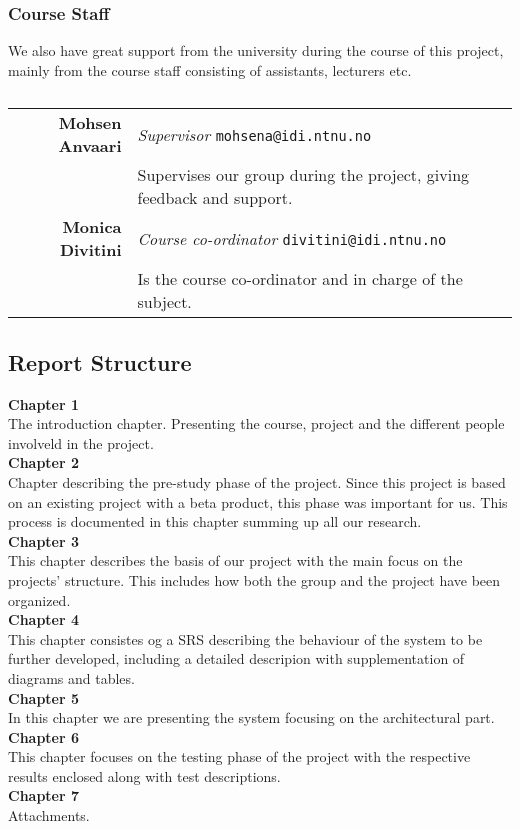 \subsubsection{Course Staff}
We also have great support from the university during the course of this project, mainly from the course staff consisting of assistants, lecturers etc.

\begin{table}[!ht]
\begin{tabular}{r|p{11cm}}
\textbf{Mohsen Anvaari} & \emph{Supervisor}   \texttt{mohsena@idi.ntnu.no}\\[6pt]
& Supervises our group during the project, giving feedback and support. \\[8pt]
\textbf{Monica Divitini} & \emph{Course co-ordinator}   \texttt{divitini@idi.ntnu.no}\\[6pt]
& Is the course co-ordinator and in charge of the subject.\\
\end{tabular}
\caption[Course Staff]{}
\end{table}

\subsection{Report Structure}

\textbf{Chapter 1}\\
 The introduction chapter. Presenting the course, project and the different people involveld in the project.\\[20pt]
\textbf{Chapter 2}\\
Chapter describing the pre-study phase of the project. Since this project is based on an existing project with a beta product, this phase was important for us. This process is documented in this chapter summing up all our research. \\[20pt]
\textbf{Chapter 3}\\
This chapter describes the basis of our project with the main focus on the projects' structure. This includes how both the group and the project have been organized.\\[20pt]
\textbf{Chapter 4}\\
 This chapter consistes og a SRS describing the behaviour of the system to be further developed, including a detailed descripion with supplementation of diagrams and tables.\\[20pt]
\textbf{Chapter 5}\\
In this chapter we are presenting the system focusing on the architectural part.\\[20pt]
\textbf{Chapter 6}\\
This chapter focuses on the testing phase of the project with the respective results enclosed along with test descriptions.\\[20pt]
 \textbf{Chapter 7}\\
Attachments.\\

